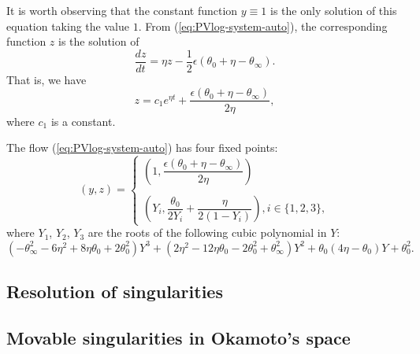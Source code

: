 It is worth observing that the constant function $y\equiv1$ is the only solution of this equation taking the value $1$.
From (\ref{eq:PVlog-system-auto}), the corresponding function $z$ is the solution of
$$
\frac{dz}{dt}=
\eta z-\frac12\epsilon(\theta_0+\eta-\theta_{\infty}).
$$
That is, we have
$$
z=c_1 e^{\eta t}+\frac{\epsilon(\theta_0+\eta-\theta_{\infty})}{2\eta},
$$
where $c_1$ is a constant.

The flow (\ref{eq:PVlog-system-auto}) has four fixed points: 
\begin{equation*}
(y, z)=
  \begin{cases}
   \left(1, \dfrac{\epsilon(\theta_0+\eta-\theta_{\infty})}{2\eta}\right)\\
   \\
   \left(Y_i, \dfrac{\theta_0}{2Y_i}+\dfrac{\eta}{2(1-Y_i)}\right), i\in\{1,2,3\},
  \end{cases}
\end{equation*}
where $Y_1$, $Y_2$, $Y_3$ are the roots of the following cubic polynomial in $Y$:
\[
  \left(-\theta_{\infty}^2 -   6 \eta^2 + 8 \eta \theta_0 + 2\theta_0^2\right) Y^3
 +\left( 2 \eta^2 - 12 \eta \theta_0 - 2\theta_0^2+\theta_{\infty}^2 \right) Y^2 
+\theta_0 (4 \eta - \theta_0) Y
+\theta_0^2.
\]

%


\subsection{Resolution of singularities}\label{sec:okamoto}


\subsection{Movable singularities in Okamoto's space}\label{sec:poles}



